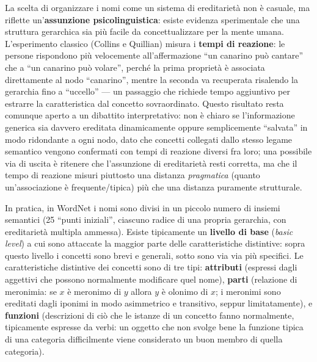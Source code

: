 \documentclass[11pt,a4paper]{report}
\begin{document}
La scelta di organizzare i nomi come un sistema di ereditarietà non è casuale, ma riflette un'\textbf{assunzione psicolinguistica}: esiste evidenza sperimentale che una struttura gerarchica sia più facile da concettualizzare per la mente umana. L'esperimento classico (Collins e Quillian) misura i \textbf{tempi di reazione}: le persone rispondono più velocemente all'affermazione ``un canarino può cantare'' che a ``un canarino può volare'', perché la prima proprietà è associata direttamente al nodo ``canarino'', mentre la seconda va recuperata risalendo la gerarchia fino a ``uccello'' --- un passaggio che richiede tempo aggiuntivo per estrarre la caratteristica dal concetto sovraordinato. Questo risultato resta comunque aperto a un dibattito interpretativo: non è chiaro se l'informazione generica sia davvero ereditata dinamicamente oppure semplicemente ``salvata'' in modo ridondante a ogni nodo, dato che concetti collegati dallo stesso legame semantico vengono confermati con tempi di reazione diversi fra loro; una possibile via di uscita è ritenere che l'assunzione di ereditarietà resti corretta, ma che il tempo di reazione misuri piuttosto una distanza \emph{pragmatica} (quanto un'associazione è frequente/tipica) più che una distanza puramente strutturale.

In pratica, in WordNet i nomi sono divisi in un piccolo numero di insiemi semantici (25 ``punti iniziali'', ciascuno radice di una propria gerarchia, con ereditarietà multipla ammessa). Esiste tipicamente un \textbf{livello di base} (\emph{basic level}) a cui sono attaccate la maggior parte delle caratteristiche distintive: sopra questo livello i concetti sono brevi e generali, sotto sono via via più specifici. Le caratteristiche distintive dei concetti sono di tre tipi: \textbf{attributi} (espressi dagli aggettivi che possono normalmente modificare quel nome), \textbf{parti} (relazione di meronimia: se $x$ è meronimo di $y$ allora $y$ è olonimo di $x$; i meronimi sono ereditati dagli iponimi in modo asimmetrico e transitivo, seppur limitatamente), e \textbf{funzioni} (descrizioni di ciò che le istanze di un concetto fanno normalmente, tipicamente espresse da verbi: un oggetto che non svolge bene la funzione tipica di una categoria difficilmente viene considerato un buon membro di quella categoria).
\end{document}
